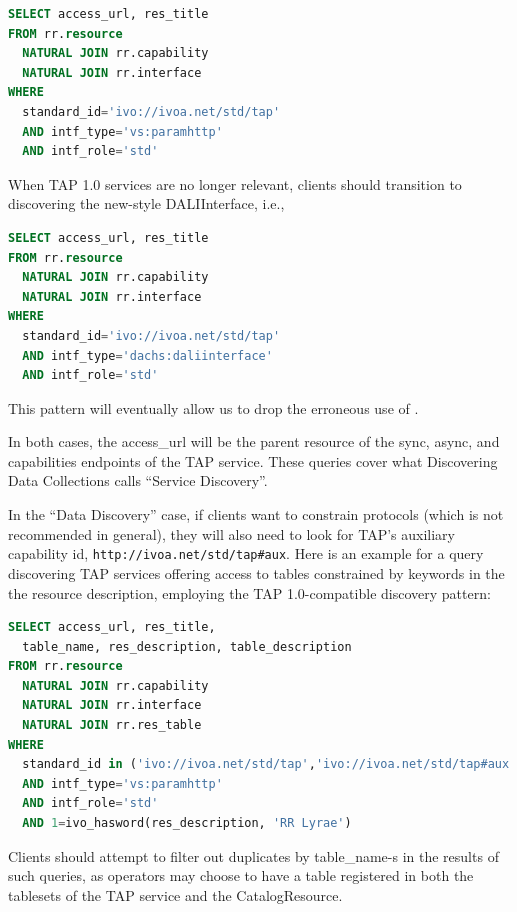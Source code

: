 \documentclass{ivoa}
\begin{document}
\begin{lstlisting}[language=SQL]
SELECT access_url, res_title
FROM rr.resource
  NATURAL JOIN rr.capability
  NATURAL JOIN rr.interface
WHERE
  standard_id='ivo://ivoa.net/std/tap'
  AND intf_type='vs:paramhttp'
  AND intf_role='std'
\end{lstlisting}

When TAP 1.0 services are no longer relevant, clients should transition
to discovering the new-style DALIInterface, i.e.,

\begin{lstlisting}[language=SQL]
SELECT access_url, res_title
FROM rr.resource
  NATURAL JOIN rr.capability
  NATURAL JOIN rr.interface
WHERE
  standard_id='ivo://ivoa.net/std/tap'
  AND intf_type='dachs:daliinterface'
  AND intf_role='std'
\end{lstlisting}

This pattern will eventually allow us to drop the erroneous use of
.

In both cases, the access\_url will be the parent resource of the sync,
async, and capabilities endpoints of the TAP service.  These queries
cover what Discovering Data Collections \citep{2019ivoa.spec.0520D}
calls ``Service Discovery''.

In the ``Data Discovery'' case, if clients want to constrain protocols
(which is not recommended in general), they will also need to look for
TAP's auxiliary capability id, \nolinkurl{http://ivoa.net/std/tap#aux}.
Here is an example for a query discovering TAP services offering access
to tables constrained by keywords in the the resource description,
employing the TAP 1.0-compatible discovery pattern:

\begin{lstlisting}[language=SQL]
SELECT access_url, res_title, 
  table_name, res_description, table_description
FROM rr.resource
  NATURAL JOIN rr.capability
  NATURAL JOIN rr.interface
  NATURAL JOIN rr.res_table
WHERE
  standard_id in ('ivo://ivoa.net/std/tap','ivo://ivoa.net/std/tap#aux')
  AND intf_type='vs:paramhttp'
  AND intf_role='std'
  AND 1=ivo_hasword(res_description, 'RR Lyrae')
\end{lstlisting}

Clients should attempt to filter out duplicates by table\_name-s in the
results of such queries, as operators may choose to have a table
registered in both the tablesets of the TAP service and the
CatalogResource.
\end{document}
